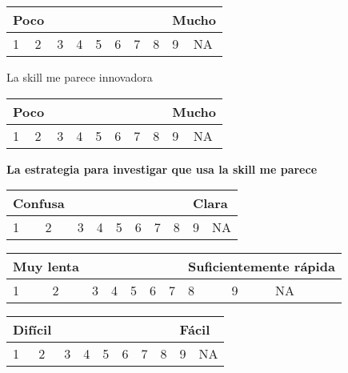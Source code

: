 \begin{tcolorbox}[colback=white!25!white,colframe=blue]
  \begin{tabular}{| p{1cm} | p{1cm} | p{1cm} | p{1cm} | p{1cm} | p{1cm} | p{1cm} | p{1cm} | p{1cm} | p{1cm} |}
    \multicolumn{2}{p{1cm}}{Poco} & \multicolumn{6}{p{1cm}}{} & \multicolumn{2}{p{1cm}}{Mucho} \\ \hline
    1 & 2 & 3 & 4 & 5 & 6 & 7 & 8 & 9 & NA \\ \hline
  \end{tabular}

  La skill me parece innovadora

  \begin{tabular}{| p{1cm} | p{1cm} | p{1cm} | p{1cm} | p{1cm} | p{1cm} | p{1cm} | p{1cm} | p{1cm} | p{1cm} |}
    \multicolumn{2}{p{1cm}}{Poco} & \multicolumn{6}{p{1cm}}{} & \multicolumn{2}{p{1cm}}{Mucho} \\ \hline
    1 & 2 & 3 & 4 & 5 & 6 & 7 & 8 & 9 & NA \\ \hline
  \end{tabular}

  \hfill

  \textbf{La estrategia para investigar que usa la skill me parece}

  \begin{tabular}{| p{1cm} | p{1cm} | p{1cm} | p{1cm} | p{1cm} | p{1cm} | p{1cm} | p{1cm} | p{1cm} | p{1cm} |}
    \multicolumn{2}{p{1cm}}{Confusa} & \multicolumn{6}{p{1cm}}{} & \multicolumn{2}{p{1cm}}{Clara} \\ \hline
    1 & 2 & 3 & 4 & 5 & 6 & 7 & 8 & 9 & NA \\ \hline
  \end{tabular}

  \begin{tabular}{| p{1cm} | p{1cm} | p{1cm} | p{1cm} | p{1cm} | p{1cm} | p{1cm} | p{1cm} | p{1cm} | p{1cm} |}
    \multicolumn{2}{p{1cm}}{Muy lenta} & \multicolumn{5}{p{1cm}}{} & \multicolumn{3}{p{2cm}}{Suficientemente rápida} \\ \hline
    1 & 2 & 3 & 4 & 5 & 6 & 7 & 8 & 9 & NA \\ \hline
  \end{tabular}

  \begin{tabular}{| p{1cm} | p{1cm} | p{1cm} | p{1cm} | p{1cm} | p{1cm} | p{1cm} | p{1cm} | p{1cm} | p{1cm} |}
    \multicolumn{2}{p{1cm}}{Difícil} & \multicolumn{6}{p{1cm}}{} & \multicolumn{2}{p{1cm}}{Fácil} \\ \hline
    1 & 2 & 3 & 4 & 5 & 6 & 7 & 8 & 9 & NA \\ \hline
  \end{tabular}


\end{tcolorbox}
